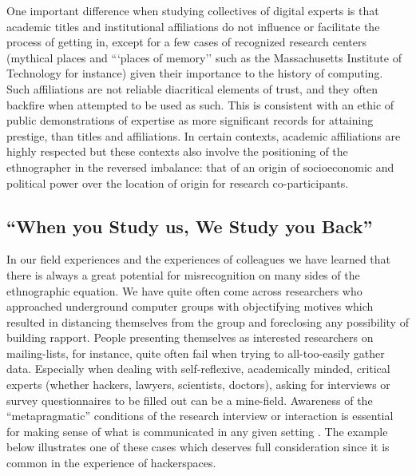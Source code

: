 \documentclass[10pt,letter,oneside]{scrartcl}
\begin{document}
One important difference when studying collectives of digital experts
is that academic titles and institutional affiliations do not
influence or facilitate the process of getting in, except for a few
cases of recognized research centers (mythical places and ```places of
memory'' such as the Massachusetts Institute of Technology for instance) 
given their importance to the history of computing. Such affiliations are 
not reliable diacritical elements of trust, and they often backfire when attempted
to be used as such.  This is consistent with an ethic of public demonstrations of 
expertise as more significant records for attaining prestige, than titles and
affiliations. In certain contexts, academic affiliations are highly
respected but these contexts also involve the positioning of the
ethnographer in the reversed imbalance: that of an origin of
socioeconomic and political power over the location of origin for
research co-participants.

\subsection*{``When you Study us, We Study you Back''} 

In our field experiences and the experiences of colleagues we have
learned that there is always a great potential for misrecognition on
many sides of the ethnographic equation. We have quite often come
across researchers who approached underground computer groups with
objectifying motives which resulted in distancing themselves from the
group and foreclosing any possibility of building rapport.  People
presenting themselves as interested researchers on mailing-lists, for
instance, quite often fail when trying to all-too-easily gather data.
Especially when dealing with self-reflexive, academically minded,
critical experts (whether hackers, lawyers, scientists, doctors),
asking for interviews or survey questionnaires to be filled out can
be a mine-field.  Awareness of the ``metapragmatic'' conditions of the
research interview or interaction is essential for making sense of
what is communicated in any given setting \cite{Briggs1986}.  The
example below illustrates one of these cases which deserves full
consideration since it is common in the experience of hackerspaces.
\end{document}
